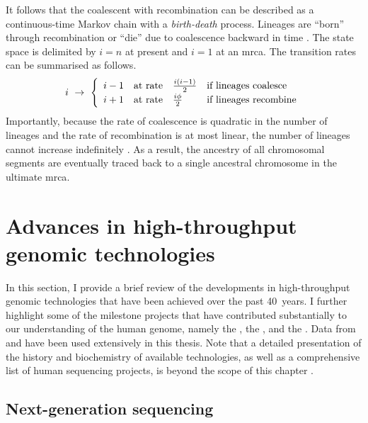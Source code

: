 It follows that the coalescent with recombination can be described as a continuous-time Markov chain with a \emph{birth-death} process.
Lineages are ``born'' through recombination or ``die'' due to coalescence backward in time \citep[\eg, see][]{tavare2004,wakeley2008}.
The state space is delimited by ${i=n}$ at present and ${i=1}$ at an \gls{mrca}.
The transition rates can be summarised as follows.
\begin{equation}
i ~\rightarrow~
\renewcommand{\arraystretch}{1.2}
\left\{
\begin{array}{llll}
	i-1  &  \text{at rate} & \frac{i(i-1)}{2} & \text{if lineages coalesce} \\
  i+1  &  \text{at rate} & \frac{i\phi}{2}  & \text{if lineages recombine}
\end{array}
\right.
\end{equation}
Importantly, because the rate of coalescence is quadratic in the number of lineages and the rate of recombination is at most linear, the number of lineages cannot increase indefinitely \citep{Wiuf:1997wf}.
As a result, the ancestry of all chromosomal segments are eventually traced back to a single ancestral chromosome in the ultimate \gls{mrca}.




%
\section{Advances in high-throughput genomic technologies}
\label{sec:technology}
%

In this section, I provide a brief review of the developments in high-throughput genomic technologies that have been achieved over the past 40~years.
I further highlight some of the milestone projects that have contributed substantially to our understanding of the human genome, namely the , the , and the .
Data from  and  have been used extensively in this thesis.
Note that a detailed presentation of the history and biochemistry of available technologies, as well as a comprehensive list of human sequencing projects, is beyond the scope of this chapter \citep[for review, \eg see][]{Metzker:2009ew,Naidoo:2011ip,Liu:2012hw,Mardis:2017cq}.


%
\subsection{Next-generation sequencing}
%

